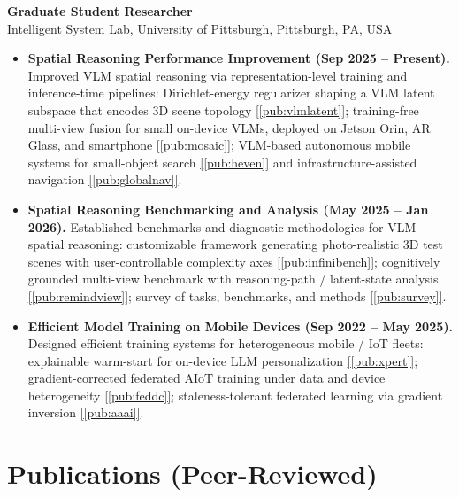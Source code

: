 \documentclass[11pt, letterpaper]{article}
\newcommand{\citeref}[1]{\hyperref[#1]{[\ref*{#1}]}}
\begin{document}
\textbf{Graduate Student Researcher}\\
Intelligent System Lab, University of Pittsburgh, Pittsburgh, PA, USA
\begin{itemize}[leftmargin=1.1em, itemsep=2pt, topsep=3pt]
  \item \textbf{Spatial Reasoning Performance Improvement (Sep 2025 -- Present).} Improved VLM spatial reasoning via representation-level training and inference-time pipelines: Dirichlet-energy regularizer shaping a VLM latent subspace that encodes 3D scene topology \citeref{pub:vlmlatent}; training-free multi-view fusion for small on-device VLMs, deployed on Jetson Orin, AR Glass, and smartphone \citeref{pub:mosaic}; VLM-based autonomous mobile systems for small-object search \citeref{pub:heven} and infrastructure-assisted navigation \citeref{pub:globalnav}.

  \item \textbf{Spatial Reasoning Benchmarking and Analysis (May 2025 -- Jan 2026).} Established benchmarks and diagnostic methodologies for VLM spatial reasoning: customizable framework generating photo-realistic 3D test scenes with user-controllable complexity axes \citeref{pub:infinibench}; cognitively grounded multi-view benchmark with reasoning-path / latent-state analysis \citeref{pub:remindview}; survey of tasks, benchmarks, and methods \citeref{pub:survey}.

  \item \textbf{Efficient Model Training on Mobile Devices (Sep 2022 -- May 2025).} Designed efficient training systems for heterogeneous mobile / IoT fleets: explainable warm-start for on-device LLM personalization \citeref{pub:xpert}; gradient-corrected federated AIoT training under data and device heterogeneity \citeref{pub:feddc}; staleness-tolerant federated learning via gradient inversion \citeref{pub:aaai}.

\end{itemize}


\section{Publications (Peer-Reviewed)}
\end{document}

